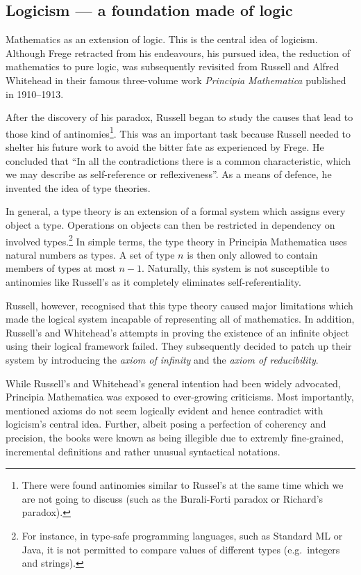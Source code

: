 \documentclass[hidelinks]{article}
\theoremstyle{plain}
\theoremstyle{definition}
\theoremstyle{rem}
\begin{document}
\subsection{Logicism --- a foundation made of logic}
Mathematics as an extension of logic. This is the central idea of logicism. Although Frege retracted from his endeavours, his pursued idea, the reduction of mathematics to pure logic, was subsequently revisited from Russell and Alfred Whitehead in their famous three-volume work \textit{Principia Mathematica} published in 1910--1913.

After the discovery of his paradox, Russell began to study the causes that lead to those kind of antinomies\footnote{There were found antinomies similar to Russel's at the same time which we are not going to discuss (such as the Burali-Forti paradox or Richard's paradox).\cite{russell_self_referentiality}}. This was an important task because Russell needed to shelter his future work to avoid the bitter fate as experienced by Frege. He concluded that ``In all the contradictions there is a common characteristic, which we may describe as self-reference or reflexiveness''\cite[p. 224]{russell_self_referentiality}. As a means of defence, he invented the idea of type theories. 

In general, a type theory is an extension of a formal system which assigns every object a type. Operations on objects can then be restricted in dependency on involved types.\footnote{For instance, in type-safe programming languages, such as Standard ML or Java, it is not permitted to compare values of different types (e.g.\ integers and strings).} In simple terms, the type theory in Principia Mathematica uses natural numbers as types. A set of type $n$ is then only allowed to contain members of types at most $n-1$. Naturally, this system is not susceptible to antinomies like Russell's as it completely eliminates self-referentiality. 

Russell, however, recognised that this type theory caused major limitations which made the logical system incapable of representing all of mathematics. In addition, Russell's and Whitehead's attempts in proving the existence of an infinite object using their logical framework failed. They subsequently decided to patch up their system by introducing the \textit{axiom of infinity} and the \textit{axiom of reducibility}.

While Russell's and Whitehead's general intention had been widely advocated, Principia Mathematica was exposed to ever-growing criticisms. Most importantly, mentioned axioms do not seem logically evident and hence contradict with logicism's central idea. Further, albeit posing a perfection of coherency and precision, the books were known as being illegible due to extremly fine-grained, incremental definitions and rather unusual syntactical notations.
\end{document}
